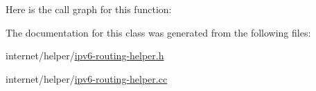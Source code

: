 Here is the call graph for this function\+:




The documentation for this class was generated from the following files\+:\begin{DoxyCompactItemize}
\item 
internet/helper/\hyperlink{ipv6-routing-helper_8h}{ipv6-\/routing-\/helper.\+h}\item 
internet/helper/\hyperlink{ipv6-routing-helper_8cc}{ipv6-\/routing-\/helper.\+cc}\end{DoxyCompactItemize}
